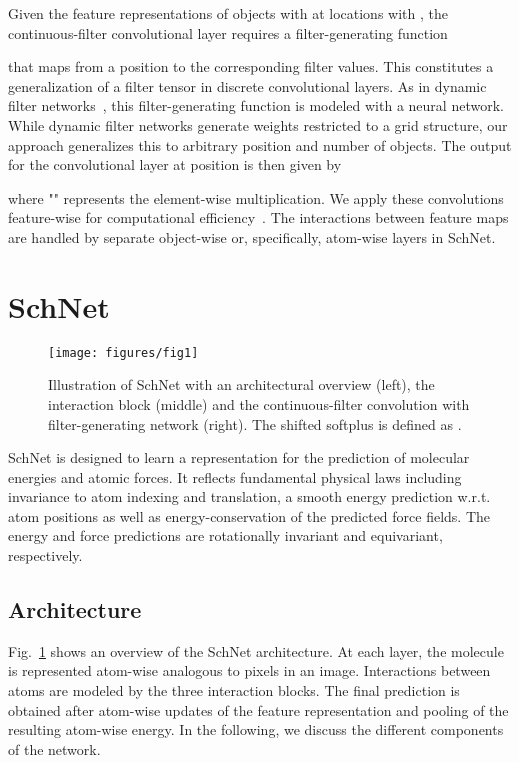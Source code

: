 \documentclass{article}
\begin{document}
Given the feature representations of  objects  with  at locations  with , the continuous-filter convolutional layer  requires a filter-generating function

that maps from a position to the corresponding filter values.
This constitutes a generalization of a filter tensor in discrete convolutional layers.
As in dynamic filter networks~\citep{BrabandereJTG16}, this filter-generating function is modeled with a neural network. 
While dynamic filter networks generate weights restricted to a grid structure, our approach generalizes this to arbitrary position and number of objects.
The output  for the convolutional layer at position  is then given by

where "" represents the element-wise multiplication. 
We apply these convolutions feature-wise for computational efficiency~\citep{chollet2016xception}.
The interactions between feature maps are handled by separate object-wise or, specifically, atom-wise layers in SchNet.


\section{SchNet}
\begin{figure}
\centering
\texttt{[image: figures/fig1]}
\caption{Illustration of SchNet with an architectural overview (left), the interaction block (middle) and the continuous-filter convolution with filter-generating network (right). The shifted softplus is defined as .}\label{fig:architecture}
\end{figure}
SchNet is designed to learn a representation for the prediction of molecular energies and atomic forces.
It reflects fundamental physical laws including invariance to atom indexing and translation, a smooth energy prediction w.r.t. atom positions as well as energy-conservation of the predicted force fields.
The energy and force predictions are rotationally invariant and equivariant, respectively.

\subsection{Architecture}
Fig.~\ref{fig:architecture} shows an overview of the SchNet architecture. 
At each layer, the molecule is represented atom-wise analogous to pixels in an image. Interactions between atoms are modeled by the three interaction blocks.
The final prediction is obtained after atom-wise updates of the feature representation and pooling of the resulting atom-wise energy.
In the following, we discuss the different components of the network.
\end{document}
